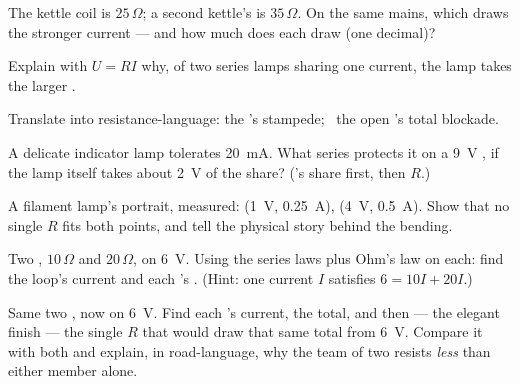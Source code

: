 \begin{exercise}[$\star$]\label{exo:g8:ohms-law:6}
The kettle coil is $25\,\Omega$; a second kettle's is
$35\,\Omega$. On the same mains, which draws the stronger
current --- and how much does each draw (one decimal)?
\end{exercise}

\begin{exercise}[$\star$]\label{exo:g8:ohms-law:7}
Explain with $U = R I$ why, of two series lamps sharing one
current, the  lamp takes the larger .
\end{exercise}

\begin{exercise}[$\star$]\label{exo:g8:ohms-law:8}
Translate into resistance-language: the 's
stampede; \ the open 's total blockade.
\end{exercise}

\begin{exercise}[$\star\star$]\label{exo:g8:ohms-law:9}
A delicate indicator lamp tolerates \qty{20}{mA}. What series
 protects it on a \qty{9}{V} , if the lamp
itself takes about \qty{2}{V} of the share? ('s share
first, then $R$.)
\end{exercise}

\begin{exercise}[$\star\star$]\label{exo:g8:ohms-law:10}
A filament lamp's portrait, measured: (\qty{1}{V},
\qty{0.25}{A}), (\qty{4}{V}, \qty{0.5}{A}). Show that no
single $R$ fits both points, and tell the physical story
behind the bending.
\end{exercise}

\begin{exercise}[$\star\star$]\label{exo:g8:ohms-law:11}
Two  , $10\,\Omega$ and $20\,\Omega$, on
\qty{6}{V}. Using the series laws plus Ohm's law on each:
find the loop's current and each 's . (Hint:
one current $I$ satisfies $6 = 10 I + 20 I$.)
\end{exercise}

\begin{exercise}[$\star\star\star$]\label{exo:g8:ohms-law:12}
Same two , now  on \qty{6}{V}. Find each
's current, the  total, and then --- the
elegant finish --- the single  $R$ that would draw
that same total from \qty{6}{V}. Compare it with both
 and explain, in road-language, why the team of two
resists \emph{less} than either member alone.
\end{exercise}

